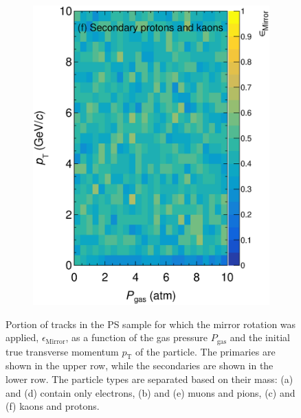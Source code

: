 \begin{figure}[!ht]
\begin{subfigure}[b]{0.32\textwidth}
         \includegraphics[width=\textwidth]{figures/ch5-KF_NDGAr/ToySample/ParScan/testTPCMirrorMirrorRatioVSpTVSdens_sec_kp.eps}
         \caption{}
         \label{fig:MirrorRation_Sec_k}
     \end{subfigure}
        \caption{ Portion of tracks in the PS sample for which the mirror rotation was applied, $\epsilon_\textrm{Mirror}$, as a function of the gas pressure $P_\textrm{gas}$ and the initial true transverse momentum $p_\textrm{T}$ of the particle. The primaries are shown in the upper row, while the secondaries are shown in the lower row. The particle types are separated based on their mass: (a) and (d) contain only electrons, (b) and (e) muons and pions, (c) and (f) kaons and protons.} \label{fig:MirrorRatio}
\end{figure}

